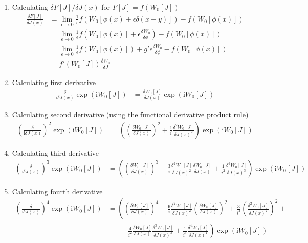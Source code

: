 \documentclass[10pt,a4paper]{book}
\theoremstyle{definition}
\begin{document}
\begin{enumerate}
\item Calculating $\delta F[J]/\delta J(x)$ for $F[J]=f\left(W_0[J]\right)$
    \begin{align}
        \frac{\delta F[J]}{\delta J(x)}
        &=\lim_{\epsilon\rightarrow0}\frac{1}{\epsilon}f(W_0[\phi(x)+\epsilon\delta(x-y)])-f(W_0[\phi(x)])\\
        &=\lim_{\epsilon\rightarrow0}\frac{1}{\epsilon}f(W_0[\phi(x)]+\epsilon\frac{\delta W_0}{\delta \phi})-f(W_0[\phi(x)])\\
        &=\lim_{\epsilon\rightarrow0}\frac{1}{\epsilon}f(W_0[\phi(x)])+g' \epsilon\frac{\delta W_0}{\delta \phi}-f(W_0[\phi(x)])\\
        &=f'(W_0[J])\frac{\delta W_0}{\delta J}
    \end{align}
\item Calculating first derivative
\begin{align}
    \frac{\delta}{\text{i}\delta J(x)}\exp\left(\text{i}W_0[J]\right)
    &=\frac{\delta W_0[J]}{\delta J(x)}\exp\left(\text{i}W_0[J]\right)
\end{align}
\item Calculating second derivative (using the functional derivative product rule)
\begin{align}
    \left(\frac{\delta}{\text{i}\delta J(x)}\right)^2\exp\left(\text{i}W_0[J]\right)
    &=\left(\left(\frac{\delta W_0[J]}{\delta J(x)}\right)^2+\frac{1}{i}\frac{\delta^2 W_0[J]}{\delta J(x)^2}\right)\exp\left(\text{i}W_0[J]\right)
\end{align}
\item Calculating third derivative
\begin{align}
    \left(\frac{\delta}{\text{i}\delta J(x)}\right)^3\exp\left(\text{i}W_0[J]\right)
    &=\left(\left(\frac{\delta W_0[J]}{\delta J(x)}\right)^3+\frac{3}{i}\frac{\delta^2 W_0[J]}{\delta J(x)^2}\frac{\delta W_0[J]}{\delta J(x)}+\frac{1}{i^2}\frac{\delta^3 W_0[J]}{\delta J(x)^3}\right)\exp\left(\text{i}W_0[J]\right)
\end{align}
\item Calculating fourth derivative
\begin{align*}
    \left(\frac{\delta}{\text{i}\delta J(x)}\right)^4\exp\left(\text{i}W_0[J]\right)
    &=\left(\left(\frac{\delta W_0[J]}{\delta J(x)}\right)^4+\frac{6}{i}\frac{\delta^2 W_0[J]}{\delta J(x)^2}\left(\frac{\delta W_0[J]}{\delta J(x)}\right)^2+\frac{3}{i^2}\left(\frac{\delta^2 W_0[J]}{\delta J(x)^2}\right)^2+\right.\\
    &\qquad\left.+\frac{4}{i^2}\frac{\delta W_0[J]}{\delta J(x)}\frac{\delta^3 W_0[J]}{\delta J(x)^3} +\frac{1}{i^3}\frac{\delta^4 W_0[J]}{\delta J(x)^4}\right)\exp\left(\text{i}W_0[J]\right)\\

\end{align*}
\end{enumerate}
\end{document}
